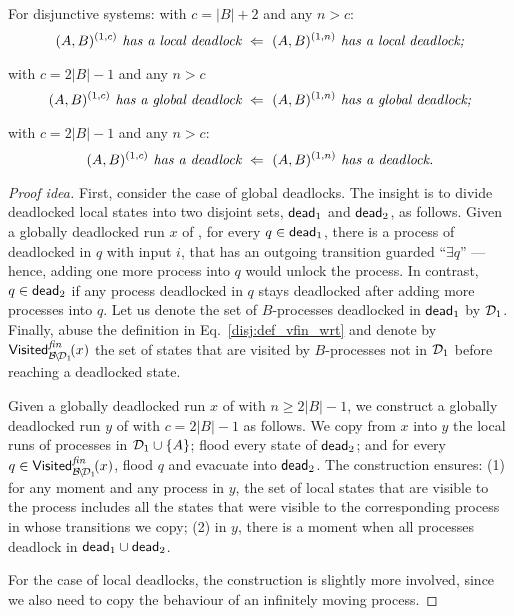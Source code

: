 \begin{lemma} \label{lem_disj_deadlocks_unfair}
For disjunctive systems:
\li
  \- with $c=|B|+2$ and any $n>c$:
  $$(A,B)^{(1,c)} \textit{ has a local deadlock} \ \Leftarrow\ (A,B)^{(1,n)} \textit{ has a local deadlock;}$$
  
  \- with $c=2|B| - 1$ and any $n>c$
  $$(A,B)^{(1,c)} \textit{ has a global deadlock} \ \Leftarrow\ (A,B)^{(1,n)} \textit{ has a global deadlock;} $$
  
  \- with $c=2|B|-1$ and any $n>c$:
  $$(A,B)^{(1,c)} \textit{ has a deadlock} \ \Implied\ (A,B)^{(1,n)} \textit{ has a deadlock.}$$
\il
{}
\end{lemma}
\begin{proof}[Proof idea]
First, consider the case of global deadlocks.
The insight is to divide deadlocked local states into two disjoint sets, 
${\sf dead}_1$ and ${\sf dead}_2$, as follows.
Given a globally deadlocked run $x$ of \largesys, 
for every $q \in {\sf dead}_1$,
there is a process of \largesys deadlocked in $q$ with input $i$,
that has an outgoing transition guarded ``$\exists q$''%
---hence, adding one more process into $q$ would unlock the process.
In contrast, $q \in {\sf dead}_2$ if any process deadlocked in $q$
stays deadlocked after adding more processes into $q$.
Let us denote the set of $B$-processes deadlocked in ${\sf dead}_1$ by $\mathcal{D}_1$.
Finally, abuse the definition in Eq.~\ref{disj:def_vfin_wrt}
and denote by $\mathsf{Visited}^{\textit{fin}}_{\mathcal{B}\!\setminus\!\mathcal{D}_1}\!(x)$ the set of states
that are visited by $B$-processes not in $\mathcal{D}_1$ before reaching a deadlocked state.

Given a globally deadlocked run $x$ of \largesys with $n\geq 2|B|-1$, 
we construct a globally deadlocked run $y$ of \cutoffsys with $c = 2|B|-1$ as follows.
\li
\- We copy from $x$ into $y$ the local runs of processes in $\mathcal{D}_1 \cup \{A\}$;
\- flood every state of ${\sf dead}_2$;
   and
\- for every $q \in \mathsf{Visited}^{\textit{fin}}_{\mathcal{B}\!\setminus\!\mathcal{D}_1}\!(x)$,
   flood $q$ and evacuate into ${\sf dead}_2$.
\il
The construction ensures: 
(1) for any moment and any process in $y$,
    the set of local states that are visible to the process includes all the states that were visible 
    to the corresponding process in \largesys whose transitions we copy;
(2) in $y$, there is a moment when all processes deadlock in ${\sf dead}_1 \cup {\sf dead}_2$.

For the case of local deadlocks, 
the construction is slightly more involved,
since we also need to copy the behaviour of an infinitely moving process.
\end{proof}

